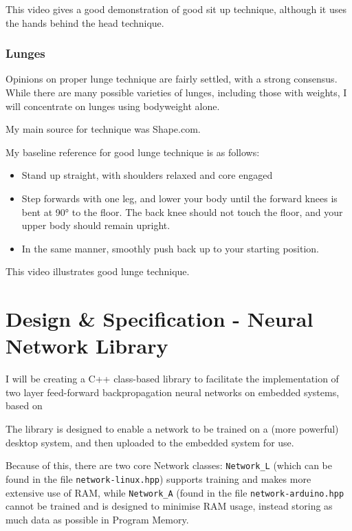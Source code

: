 \documentclass[a4paper]{article}
\begin{document}
This video\cite{bgref23} gives a good demonstration of good sit up technique, although it uses the hands behind the head technique.

\subsubsection{Lunges}

Opinions on proper lunge technique are fairly settled, with a strong consensus. While there are many possible varieties of lunges, including those with weights, I will concentrate on lunges using bodyweight alone.

My main source for technique was Shape.com\cite{bgref24}.

My baseline reference for good lunge technique is as follows:

\begin{itemize}
    \item Stand up straight, with shoulders relaxed and core engaged
    \item Step forwards with one leg, and lower your body until the forward knees is bent at 90° to the floor. The back knee should not touch the floor, and your upper body should remain upright.
    \item In the same manner, smoothly push back up to your starting position.
\end{itemize}

This video\cite{bgref25} illustrates good lunge technique.

\newpage
\section{Design \& Specification - Neural Network Library}

I will be creating a C++ class-based library to facilitate the implementation of two layer feed-forward backpropagation neural networks on embedded systems, based on 

The library is designed to enable a network to be trained on a (more powerful) desktop system, and then uploaded to the embedded system for use.

Because of this, there are two core Network classes: \lstinline{Network_L} (which can be found in the file \lstinline{network-linux.hpp}) supports training and makes more extensive use of RAM, while \lstinline{Network_A} (found in the file \lstinline{network-arduino.hpp} cannot be trained and is designed to minimise RAM usage, instead storing as much data as possible in Program Memory.
\end{document}

